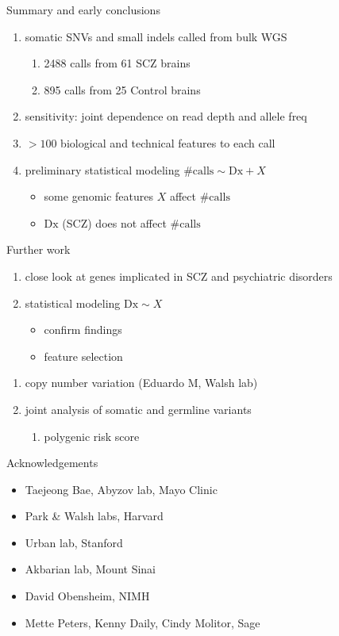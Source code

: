 \documentclass[usenames,dvipsnames]{beamer}
\begin{document}
\begin{frame}{Summary and early conclusions}
\begin{enumerate}
\item somatic SNVs and small indels called from bulk WGS 
\begin{enumerate}
\item 2488 calls from 61 SCZ brains
\item 895 calls from 25 Control brains
\end{enumerate}
\item sensitivity: joint dependence on read depth and allele freq
\item \(> 100\) biological and technical features to each call
\item preliminary statistical modeling \(\mathrm{\#calls} \sim \mathrm{Dx} + X\)
\begin{itemize}
\item some genomic features \(X\) affect \(\mathrm{\#calls}\)
\item \(\mathrm{Dx}\) (SCZ) does not affect \(\mathrm{\#calls}\)
\end{itemize}
\end{enumerate}
\end{frame}

\begin{frame}{Further work}
\begin{enumerate}
\item close look at genes implicated in SCZ and psychiatric disorders
\item statistical modeling \(\mathrm{Dx} \sim X\)
\begin{itemize}
\item confirm findings
\item feature selection
\end{itemize}
\end{enumerate}
\begin{enumerate}
\item copy number variation (Eduardo M, Walsh lab)
\item joint analysis of somatic and germline variants
\begin{enumerate}
\item polygenic risk score
\end{enumerate}
\end{enumerate}
\end{frame}

\begin{frame}{Acknowledgements}
\begin{itemize}
\item Taejeong Bae, Abyzov lab, Mayo Clinic
\item Park \& Walsh labs, Harvard %
\item Urban lab, Stanford %
\item Akbarian lab, Mount Sinai %
\item David Obensheim, NIMH
\item Mette Peters, Kenny Daily, Cindy Molitor, Sage
\end{itemize}
\end{frame}
\end{document}

